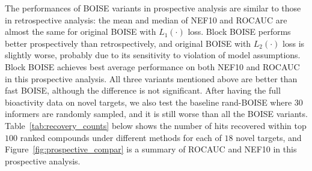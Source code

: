 \documentclass[11pt,a4paper]{article}
\theoremstyle{plain}
\begin{document}
The performances of BOISE variants in prospective analysis are similar to those in retrospective analysis: the mean and median of NEF10 and ROCAUC are almost the same for original BOISE with $L_1(\cdot)$ loss. Block BOISE performs better prospectively than retrospectively, and original BOISE with $L_2(\cdot)$ loss is slightly worse, probably due to its sensitivity to violation of model assumptions. Block BOISE achieves best average performance on both NEF10 and ROCAUC in this prospective analysis. All three variants mentioned above are better than fast BOISE, although the difference is not significant. After having the full bioactivity data on novel targets, we also test the baseline rand-BOISE where $30$ informers are randomly sampled, and it is still worse than all the BOISE variants. Table~\ref{tab:recovery_counts} below shows the number of hits recovered within top $100$ ranked compounds under different methods for each of $18$ novel targets, and Figure~\ref{fig:prospective_compar} is a summary of ROCAUC and NEF10 in this prospective analysis.
\end{document}
